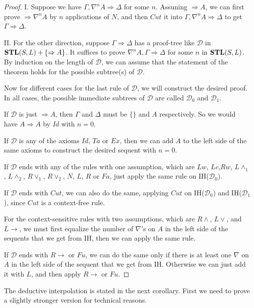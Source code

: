 \begin{proof}
	I. Suppose we have $\Gamma, \nabla^n A \Rightarrow \Delta$ for some $n$. Assuning $\Rightarrow A$, we can first prove $\Rightarrow \nabla^n A$ by $n$ applications of $N$, and then $Cut$ it into $\Gamma, \nabla^n A \Rightarrow \Delta$ to get $\Gamma \Rightarrow \Delta$.

	II. For the other direction, suppose $\Gamma \Rightarrow \Delta$ has a proof-tree like $\mathcal{D}$ in $\mathbf{STL}(S,L)+\{\Rightarrow A\}$. It suffices to prove $\nabla^n A, \Gamma \Rightarrow \Delta$ for some $n$ in $\mathbf{STL}(S,L)$. By induction on the length of $\mathcal{D}$, we can assume that the statement of the theorem holds for the possible subtree(s) of $\mathcal{D}$.

	Now for different cases for the last rule of $\mathcal{D}$, we will construct the desired proof. In all cases, the possible immediate subtrees of $\mathcal{D}$ are called $\mathcal{D}_0$ and $\mathcal{D}_1$.
	
	If $\mathcal{D}$ is just $\Rightarrow A$, then $\Gamma$ and $\Delta$ must be $\{\}$ and $A$ respectively. So we would have $A \Rightarrow A$ by $Id$ with $n = 0$.

	If $\mathcal{D}$ is any of the axioms $Id$, $Ta$ or $Ex$, then we can add $A$ to the left side of the same axioms to construct the desired sequent with $n = 0$.

	If $\mathcal{D}$ ends with any of the rules with one assumption, which are $Lw$, $Lc$,$Rw$, $L\land_1$, $L\land_2$, $R\lor_1$, $R\lor_2$, $N$, $L$, $R$ or $Fa$, just apply the same rule on IH($\mathcal{D}_0$).

	If $\mathcal{D}$ ends with $Cut$, we can also do the same, applying $Cut$ on IH($\mathcal{D}_0$) and IH($\mathcal{D}_1$), since $Cut$ is a context-free rule.

	For the context-sensitive rules with two assumptions, which are $R\land$, $L\lor$, and $L\rightarrow$, we must first equalize the number of $\nabla$'s on $A$ in the left side of the sequents that we get from IH, then we can apply the same rule.

	If $\mathcal{D}$ ends with $R\rightarrow$ or $Fu$, we can do the same only if there is at least one $\nabla$ on $A$ in the left side of the sequent that we get from IH. Otherwise we can just add it with $L$, and then apply $R\rightarrow$ or $Fu$.
\end{proof}

The deductive interpolation is stated in the next corollary. First we need to prove a slightly stronger version for technical reasons.

